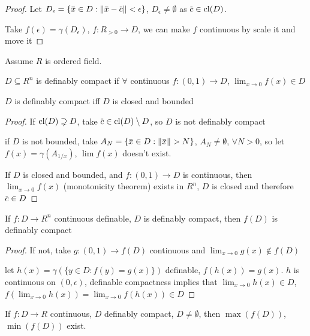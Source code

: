 \documentclass[11pt]{article}
\begin{document}
\begin{proof}
Let \(D_\epsilon=\{\barx\in D:\norm{\barx-\barc}<\epsilon\}\), \(D_\epsilon\neq\emptyset\) as \(\barc\in\cl(D)\).

Take \(f(\epsilon)=\gamma(D_\epsilon)\), \(f:R_{>0}\to D\), we can make \(f\) continuous by scale it and move it
\end{proof}

Assume \(R\) is ordered field.
\begin{definition}[]
\(D\subseteq R^n\) is definably compact if \(\forall\) continuous \(f:(0,1)\to D\), \(\lim_{x\to 0}f(x)\in D\)
\end{definition}

\begin{theorem}[]
\(D\) is definably compact iff \(D\) is closed and bounded
\end{theorem}

\begin{proof}
If \(\operatorname{\text{cl}}(D)\supsetneq D\), take \(\barc\in\cl(D)\setminus D\), so \(D\) is not definably compact

if \(D\) is not bounded, take \(A_N=\{\barx\in D:\norm{\barx}>N\}\), \(A_N\neq\emptyset\), \(\forall N>0\), so
let \(f(x)=\gamma(A_{1/x})\), \(\lim f(x)\) doesn't exist.

If \(D\) is closed and bounded, and \(f:(0,1)\to D\) is continuous, then \(\lim_{x\to 0}f(x)\)
(monotonicity theorem)
exists in \(R^n\), \(D\) is closed and therefore \(\barc\in D\)
\end{proof}

\begin{theorem}[]
If \(f:D\to R^n\) continuous definable, \(D\) is definably compact, then \(f(D)\) is definably compact
\end{theorem}

\begin{proof}
If not, take \(g:(0,1)\to f(D)\) continuous and \(\lim_{x\to 0}g(x)\notin f(D)\)

let \(h(x)=\gamma(\{y\in D:f(y)=g(x)\})\) definable, \(f(h(x))=g(x)\). \(h\) is continuous on \((0,\epsilon)\),
definable compactness implies
that \(\lim_{x\to 0}h(x)\in D\), \(f(\lim_{x\to 0}h(x))=\lim_{x\to 0}f(h(x))\in D\)
\end{proof}

\begin{corollary}[]
If \(f:D\to R\) continuous, \(D\) definably compact, \(D\neq\emptyset\), then \(\max(f(D))\), \(\min(f(D))\)
exist.
\end{corollary}
\end{document}
